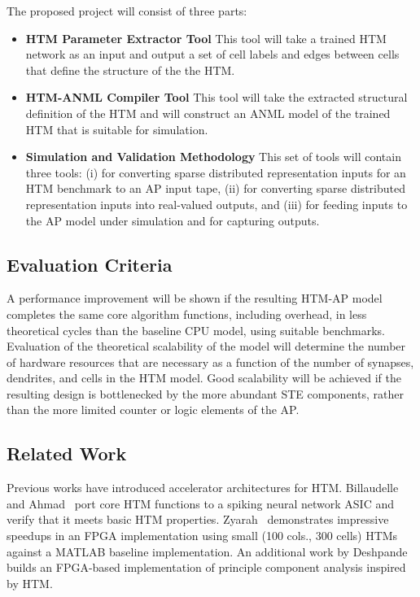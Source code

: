 The proposed project will consist of three parts:
\begin{itemize}
\item \textbf{HTM Parameter Extractor Tool} This tool will take a trained HTM network as an input and output a set of cell labels and edges between cells that define the structure of the the HTM.
\item \textbf{HTM-ANML Compiler Tool} This tool will take the extracted structural definition of the HTM and will construct an ANML model of the trained HTM that is suitable for simulation.
\item \textbf{Simulation and Validation Methodology} This set of tools will contain three tools: (i) for converting sparse distributed representation inputs for an HTM benchmark to an AP input tape, (ii) for converting sparse distributed representation inputs into real-valued outputs, and (iii) for feeding inputs to the AP model under simulation and for capturing outputs.
\end{itemize}

\subsection{Evaluation Criteria} 
A performance improvement will be shown if the resulting HTM-AP model completes the same core algorithm functions, including overhead, in less theoretical cycles than the baseline CPU model, using suitable benchmarks.
Evaluation of the theoretical scalability of the model will determine the number of hardware resources that are necessary as a function of the number of synapses, dendrites, and cells in the HTM model.
Good scalability will be achieved if the resulting design is bottlenecked by the more abundant STE components, rather than the more limited counter or logic elements of the AP.

\subsection{Related Work}

Previous works have introduced accelerator architectures for HTM. 
Billaudelle and Ahmad~\cite{BillaudelleAhmad} port core HTM functions to a spiking neural network ASIC and verify that it meets basic HTM properties. 
Zyarah~\cite{FPGAThesis} demonstrates impressive speedups in an FPGA implementation using small (100 cols., 300 cells) HTMs against a MATLAB baseline implementation. 
An additional work by Deshpande~\cite{InspiredThesis} builds an FPGA-based implementation of principle component analysis inspired by HTM.

